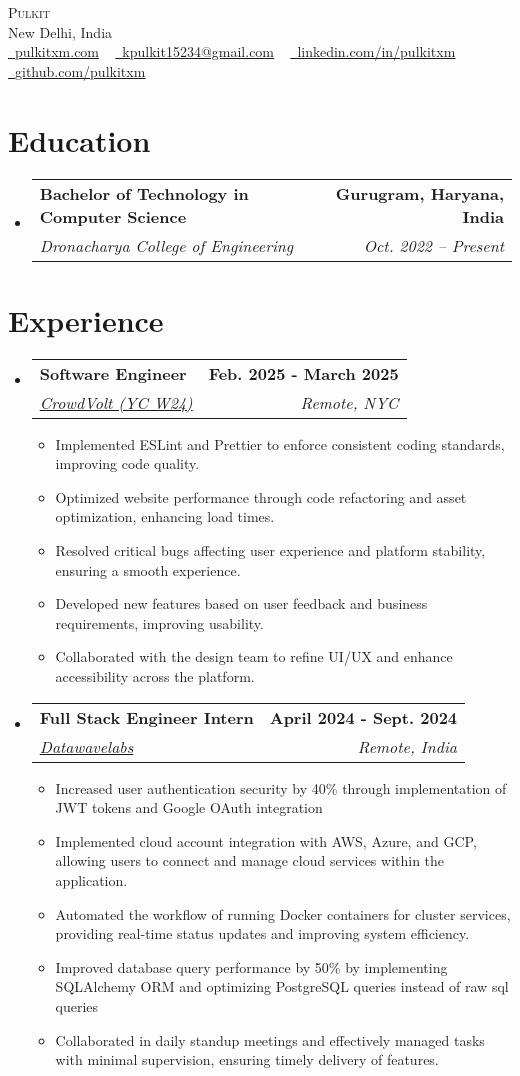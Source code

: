 \documentclass[letterpaper,11pt]{article}
\makeatletter
\newcommand{\resumeItem}[1]{
  \item{
    {#1 \vspace{-2pt}}
  }
}
\newcommand{\resumeSubheading}[4]{
  \vspace{-2pt}\item
    \begin{tabular*}{1.0\textwidth}[t]{l@{\extracolsep{\fill}}r}
      \textbf{#1} & \textbf{ #2} \\
      \textit{#3} & \textit{ #4} \\
    \end{tabular*}\vspace{-7pt}
}
\newcommand{\resumeSubHeadingListStart}{\begin{itemize}[leftmargin=0.0in, label={}]}
\newcommand{\resumeSubHeadingListEnd}{\end{itemize}}
\newcommand{\resumeItemListStart}{\begin{itemize}}
\newcommand{\resumeItemListEnd}{\end{itemize}\vspace{-5pt}}
\makeatother
\begin{document}
\begin{center}
	{\Huge \scshape Pulkit} \\ \vspace{3pt}
	New Delhi, India \\ \vspace{3pt}
	\small
	\href{https://www.pulkitxm.com/}{\raisebox{-0.2\height}\faLink\ \underline{pulkitxm.com}} ~
	\href{mailto:kpulkit15234@gmail.com}{\raisebox{-0.2\height}\faEnvelope\ \underline{kpulkit15234@gmail.com}} ~
	\href{https://www.linkedin.com/in/pulkitxm}{\raisebox{-0.2\height}\faLinkedin\ \underline{linkedin.com/in/pulkitxm}} ~
	\href{https://github.com/Pulkitxm}{\raisebox{-0.2\height}\faGithub\ \underline{github.com/pulkitxm}}
	\vspace{-8pt}
\end{center}

\section{Education}
\resumeSubHeadingListStart%
\resumeSubheading%
{Bachelor of Technology in Computer Science}{Gurugram, Haryana, India}
{Dronacharya College of Engineering}{Oct. 2022 – Present}
\resumeSubHeadingListEnd%

\section{Experience}
\resumeSubHeadingListStart%
\resumeSubheading%
{Software Engineer}{Feb. 2025 - March 2025}
{\href{https://www.datawavelabs.io/}{CrowdVolt (YC W24)}}{Remote, NYC}
\resumeItemListStart%
\resumeItem{Implemented ESLint and Prettier to enforce consistent coding standards, improving code quality.}
\resumeItem{Optimized website performance through code refactoring and asset optimization, enhancing load times.}
\resumeItem{Resolved critical bugs affecting user experience and platform stability, ensuring a smooth experience.}
\resumeItem{Developed new features based on user feedback and business requirements, improving usability.}
\resumeItem{Collaborated with the design team to refine UI/UX and enhance accessibility across the platform.}
\resumeItemListEnd%
\resumeSubheading%
{Full Stack Engineer Intern}{April 2024 - Sept. 2024}
{\href{https://www.datawavelabs.io/}{Datawavelabs}}{Remote, India}
\resumeItemListStart%
\resumeItem{Increased user authentication security by 40\% through implementation of JWT tokens and Google OAuth integration}
\resumeItem{Implemented cloud account integration with AWS, Azure, and GCP, allowing users to connect and manage cloud services within the application.}
\resumeItem{Automated the workflow of running Docker containers for cluster services, providing real-time status updates and improving system efficiency.}
\resumeItem{Improved database query performance by 50\% by implementing SQLAlchemy ORM and optimizing PostgreSQL queries instead of raw sql queries}
\resumeItem{Collaborated in daily standup meetings and effectively managed tasks with minimal supervision, ensuring timely delivery of features.}
\resumeItemListEnd%
\resumeSubHeadingListEnd%
\vspace{-14pt}
\end{document}
